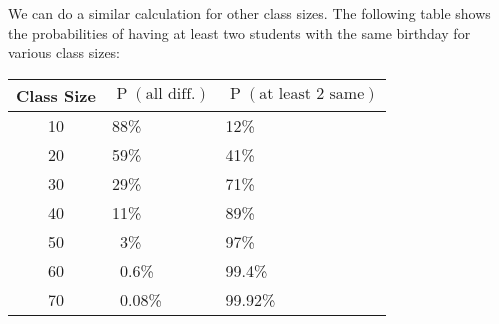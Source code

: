 \documentclass[answers,11pt]{exam}
\DeclareMathOperator*{\Prob}{P}
\renewcommand{\Pr}{\Prob}
\begin{document}
\begin{questions}
\begin{solution}
We can do a similar calculation for other class sizes.
The following table shows the probabilities of having at least two students
with the same birthday for various class sizes:

\vspace{1\baselineskip}
\begin{center}
\begin{tabular}{cll}
\toprule
Class Size & $\Pr(\text{all diff.})$ & $\Pr(\text{at least 2 same})$ \\
\midrule
10 & 88\% & 12\% \\
20 & 59\% & 41\% \\
30 & 29\% & 71\% \\
40 & 11\% & 89\% \\
50 & $\phantom{0}$3\% & 97\% \\
60 & $\phantom{0}$0.6\% & 99.4\% \\
70 & $\phantom{0}$0.08\% & 99.92\% \\
\bottomrule
\end{tabular}
\end{center}
\vspace{1\baselineskip}




\vspace{1\baselineskip}


\end{solution}


\end{questions}
\end{document}

